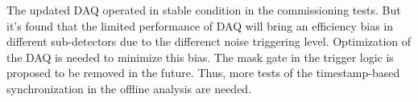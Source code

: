 \documentclass[number,5p]{elsarticle}
\begin{document}
The updated DAQ operated in stable condition in the commissioning tests.
But it's found that the limited performance of DAQ will bring an efficiency bias in different
sub-detectors due to the differenct noise triggering level.
Optimization of the DAQ is needed to minimize this bias.
The mask gate in the trigger logic is proposed to be removed in the future.
Thus, more tests of the timestamp-based synchronization in the offline analysis are needed.



\end{document}
